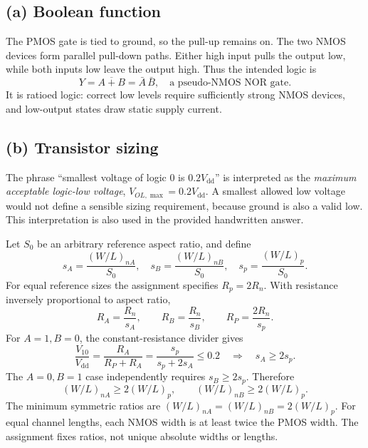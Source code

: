 \documentclass[11pt,a4paper]{article}
\newcommand{\VDD}{V_{\mathrm{dd}}}
\newcommand{\size}{\left(W/L\right)}
\begin{document}
\subsection*{(a) Boolean function}
The PMOS gate is tied to ground, so the pull-up remains on. The two NMOS
devices form parallel pull-down paths. Either high input pulls the output
low, while both inputs low leave the output high. Thus the intended logic is
\begin{equation}
 \boxed{Y=\overline{A+B}=\bar A\,\bar B,\quad\text{a pseudo-NMOS NOR gate}.}
\end{equation}
It is ratioed logic: correct low levels require sufficiently strong NMOS
devices, and low-output states draw static supply current.
\begin{center}
\end{center}

\subsection*{(b) Transistor sizing}
The phrase ``smallest voltage of logic 0 is $0.2\VDD$'' is interpreted as
the \emph{maximum acceptable logic-low voltage}, $V_{OL,\max}=0.2\VDD$.
A smallest allowed low voltage would not define a sensible sizing requirement,
because ground is also a valid low. This interpretation is also used in the
provided handwritten answer.

Let $S_0$ be an arbitrary reference aspect ratio, and define
\[
 s_A=\frac{(W/L)_{nA}}{S_0},\quad
 s_B=\frac{(W/L)_{nB}}{S_0},\quad
 s_p=\frac{(W/L)_p}{S_0}.
\]
For equal reference sizes the assignment specifies $R_p=2R_n$.
With resistance inversely proportional to aspect ratio,
\[
 R_A=\frac{R_n}{s_A},\qquad
 R_B=\frac{R_n}{s_B},\qquad
 R_P=\frac{2R_n}{s_p}.
\]
For $A=1,B=0$, the constant-resistance divider gives
\[
 \frac{V_{10}}{\VDD}=\frac{R_A}{R_P+R_A}
 =\frac{s_p}{s_p+2s_A}\leq0.2
 \quad\Longrightarrow\quad s_A\geq2s_p.
\]
The $A=0,B=1$ case independently requires $s_B\geq2s_p$. Therefore
\begin{equation}
 \boxed{\size_{nA}\geq2\size_p,\qquad
        \size_{nB}\geq2\size_p.}\label{eq:sizing}
\end{equation}
The minimum symmetric ratios are $(W/L)_{nA}=(W/L)_{nB}=2(W/L)_p$.
For equal channel lengths, each NMOS width is at least twice the PMOS width.
The assignment fixes ratios, not unique absolute widths or lengths.
\end{document}
